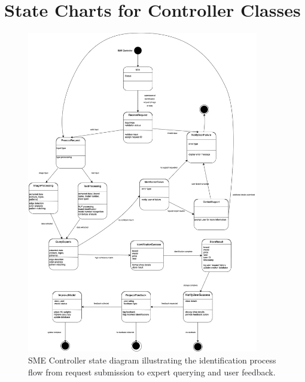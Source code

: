 \documentclass[]{article}
\begin{document}
\section{State Charts for Controller Classes}
\label{sec:state_charts_for_controller_classes}
\begin{figure}[H]
    \centering
    \includegraphics[width=0.9\textwidth]{SMEController.drawio.png}
    \caption{SME Controller state diagram illustrating the identification process flow from request submission to expert querying and user feedback.}
\end{figure}
\end{document}

